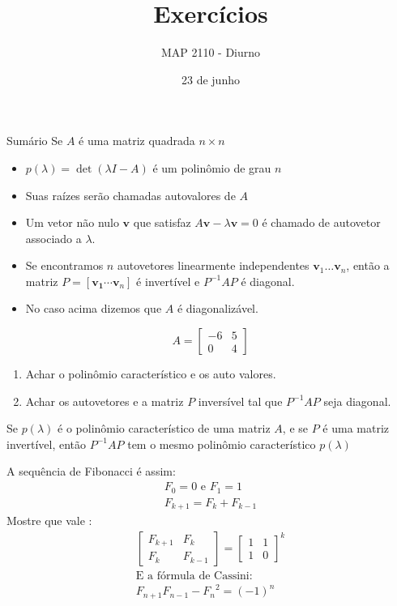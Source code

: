 \documentclass{beamer}
\title[diagonalização]{Exercícios}
\author{MAP 2110 - Diurno}
\institute{IME USP}
\date{23 de junho}
\begin{document}
\begin{frame}
  \titlepage
\end{frame}

\begin{frame}{Sumário}
  Se $A$ é uma matriz quadrada $n \times n$
  \begin{itemize}
    \item $p(\lambda) = \det(\lambda I - A)$ é um polinômio de grau $n$
    \item Suas raízes serão chamadas autovalores de $A$
    \item Um vetor não nulo $\mathbf{v}$ que satisfaz $A\mathbf{v}-\lambda\mathbf{v}=0$ é chamado de autovetor associado a $\lambda$.
    \item Se encontramos $n$ autovetores linearmente independentes $\mathbf{v}_1\dots \mathbf{v}_n$, então a matriz $P=[\mathbf{v_1}\cdots\mathbf{v}_n]$ é invertível e $P^{-1}AP$ é diagonal.
    \item No caso acima dizemos que $A$ é diagonalizável.
  \end{itemize}
  
\end{frame}
\begin{frame}{1}
  $$A = \begin{bmatrix}
    -6 & 5 \\ 0 & 4
  \end{bmatrix}$$
  \begin{enumerate}
    \item Achar o polinômio característico e os auto valores.
    \item Achar os autovetores e a matriz $P$ inversível tal que $P^{-1}AP$ seja diagonal.
  \end{enumerate}
\end{frame}

\begin{frame}{2}
  Se $p(\lambda)$ é o polinômio característico de uma matriz $A$, e se $P$ é uma matriz invertível, então 
  $P^{-1}AP$ tem o mesmo polinômio característico $p(\lambda)$
\end{frame}

\begin{frame}{3}
  A sequência de Fibonacci é assim:
  \begin{gather}
    F_0=0 \text{ e } F_1 = 1 \\
    F_{k+1} = F_k + F_{k-1}
  \end{gather}
  Mostre que vale :
  \begin{gather*}
    \begin{bmatrix}
      F_{k+1} & F_{k} \\
      F_k & F_{k-1}
    \end{bmatrix} = \begin{bmatrix}
      1 & 1 \\
      1 & 0
    \end{bmatrix}^k \\
    \text{E a fórmula de Cassini: }\\
    F_{n+1}F_{n-1} - {F_n}^2 =(-1)^n
  \end{gather*}
  
\end{frame}
\end{document}
